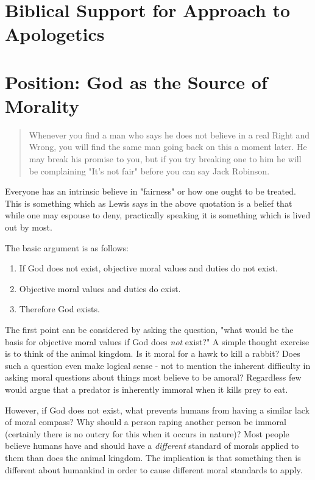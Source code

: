 \documentclass[12pt]{turabian-researchpaper}
\begin{document}
\section{Biblical Support for Approach to Apologetics}


\section{Position: God as the Source of Morality}


\begin{quotation}
\noindent Whenever you find a man who says he does not believe in a real Right and Wrong, you will find the same man going back on this a moment later. He may break his promise to you, but if you try breaking one to him he will be complaining "It's not fair" before you can say Jack Robinson.\autocite[pg.6]{lewis2001mere}
\end{quotation}

\noindent Everyone has an intrinsic believe in "fairness" or how one ought to be treated. This is something which as Lewis says in the above quotation is a belief that while one may espouse to deny, practically speaking it is something which is lived out by most.

The basic argument is as follows\autocite[pg.172]{craig2008reasonable}:

\begin{enumerate}
\item If God does not exist, objective moral values and duties do not exist.
\item Objective moral values and duties do exist.
\item Therefore God exists.
\end{enumerate}

The first point can be considered by asking the question, "what would be the basis for objective moral values if God does \textit{not} exist?" A simple thought exercise is to think of the animal kingdom. Is it moral for a hawk to kill a rabbit? Does such a question even make logical sense - not to mention the inherent difficulty in asking moral questions about things most believe to be amoral? Regardless few would argue that a predator is inherently immoral when it kills prey to eat.

However, if God does not exist, what prevents humans from having a similar lack of moral compass? Why should a person raping another person be immoral (certainly there is no outcry for this when it occurs in nature)? Most people believe humans have and should have a \textit{different} standard of morals applied to them than does the animal kingdom. The implication is that something then is different about humankind in order to cause different moral standards to apply.
\end{document}
